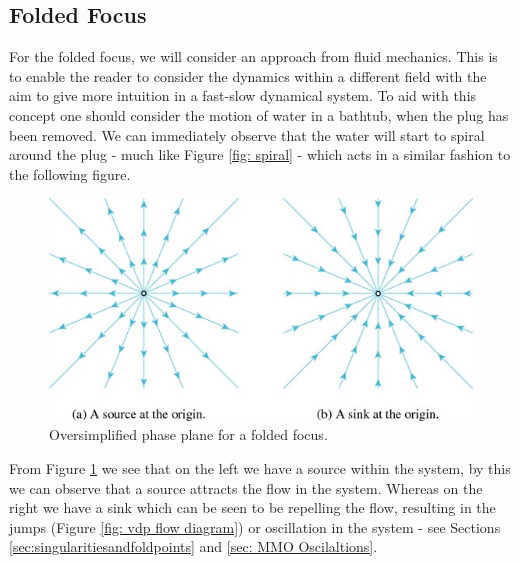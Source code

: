 \subsection{Folded Focus}
\label{a: sinksource}
For the folded focus, we will consider an approach from fluid mechanics. This is to enable the reader to consider the dynamics within a different field with the aim to give more intuition in a fast-slow dynamical system. To aid with this concept one should consider the motion of water in a bathtub, when the plug has been removed. We can immediately observe that the water will start to spiral around the plug - much like Figure \ref{fig: spiral} - which acts in a similar fashion to the following figure. 
\begin{figure}[h!]
	\centering
	\includegraphics[width=0.7\linewidth]{Images/sourcesink}
	\caption{Oversimplified phase plane for a folded focus.}
	\label{fig:source-sink}
\end{figure}
From Figure \ref{fig:source-sink} we see that on the left we have a source within the system, by this we can observe that a source attracts the flow in the system. Whereas on the right we have a sink which can be seen to be repelling the flow, resulting in the jumps (Figure \ref{fig: vdp flow diagram}) or oscillation in the system - see Sections \ref{sec:singularitiesandfoldpoints} and \ref{sec: MMO Oscilaltions}. 